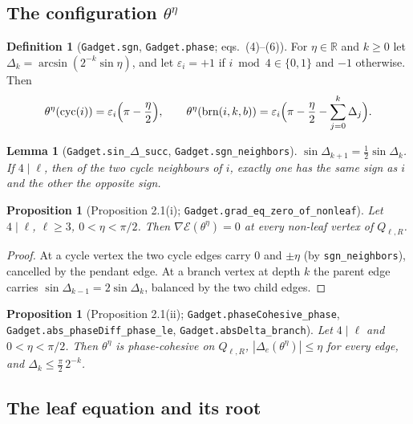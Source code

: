 \documentclass[11pt]{amsart}
\newcommand{\leanname}[1]{\texttt{\textcolor{black!75}{#1}}}
\newcommand{\E}{\mathcal{E}}
\newcommand{\R}{\mathbb{R}}
\newcommand{\Q}{Q_{\ell,R}}
\theoremstyle{plain}
\newtheorem{lemma}[theorem]{Lemma}
\newtheorem{proposition}[theorem]{Proposition}
\theoremstyle{definition}
\newtheorem{definition}[theorem]{Definition}
\theoremstyle{remark}
\begin{document}
\subsection{The configuration $\theta^\eta$}

\begin{definition}[\leanname{Gadget.sgn}, \leanname{Gadget.phase}; eqs.\ (4)--(6)]
For $\eta\in\R$ and $k\ge0$ let $\Delta_k=\arcsin(2^{-k}\sin\eta)$, and let $\varepsilon_i=+1$
if $i\bmod4\in\{0,1\}$ and $-1$ otherwise. Then
\[
\theta^\eta(\mathrm{cyc}(i))=\varepsilon_i\Bigl(\pi-\frac\eta2\Bigr),\qquad
\theta^\eta(\mathrm{brn}(i,k,b))=\varepsilon_i\Bigl(\pi-\frac\eta2-\sum_{j=0}^{k}\Delta_j\Bigr).
\]
\end{definition}

\begin{lemma}[\leanname{Gadget.sin\_}$\Delta$\leanname{\_succ}, \leanname{Gadget.sgn\_neighbors}]
$\sin\Delta_{k+1}=\tfrac12\sin\Delta_k$. If $4\mid\ell$, then of the two cycle neighbours of
$i$, exactly one has the same sign as $i$ and the other the opposite sign.
\end{lemma}

\begin{proposition}[Proposition 2.1(i); \leanname{Gadget.grad\_eq\_zero\_of\_nonleaf}]\label{prop:21i}
Let $4\mid\ell$, $\ell\ge3$, $0<\eta<\pi/2$. Then $\nabla\E(\theta^\eta)=0$ at every non-leaf
vertex of $\Q$.
\end{proposition}
\begin{proof}
At a cycle vertex the two cycle edges carry $0$ and $\pm\eta$ (by \leanname{sgn\_neighbors}),
cancelled by the pendant edge. At a branch vertex at depth $k$ the parent edge carries
$\sin\Delta_{k-1}=2\sin\Delta_k$, balanced by the two child edges.
\end{proof}

\begin{proposition}[Proposition 2.1(ii); \leanname{Gadget.phaseCohesive\_phase},
\leanname{Gadget.abs\_phaseDiff\_phase\_le}, \leanname{Gadget.absDelta\_branch}]
Let $4\mid\ell$ and $0<\eta<\pi/2$. Then $\theta^\eta$ is phase-cohesive on $\Q$,
$|\Delta_e(\theta^\eta)|\le\eta$ for every edge, and $\Delta_k\le\frac\pi2\,2^{-k}$.
\end{proposition}

\subsection{The leaf equation and its root}
\end{document}
